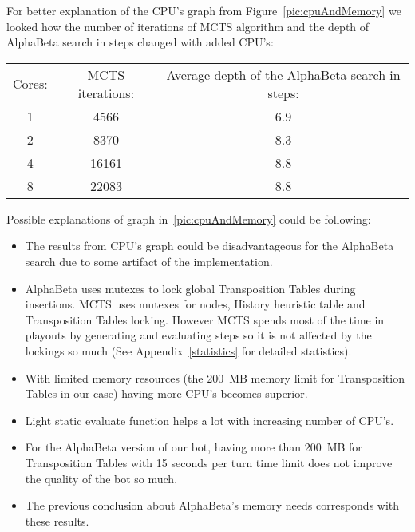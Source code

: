 For better explanation of the CPU's graph from Figure~\ref{pic:cpuAndMemory} we
looked how the number of iterations of MCTS algorithm and the depth of
AlphaBeta search in steps changed with added CPU's:

\begin{center}
\begin{tabular}{ccc}
Cores: & MCTS iterations: & Average depth of the AlphaBeta search in steps: \\
1      &  4566            & 6.9  \\
2      &  8370            & 8.3  \\
4      & 16161            & 8.8  \\
8      & 22083            & 8.8
\end{tabular}
\end{center}

Possible explanations of graph in~\ref{pic:cpuAndMemory} could be following:
\begin{itemize}
\item The results from CPU's graph could be  disadvantageous for the AlphaBeta search due to some artifact of the implementation.
\item AlphaBeta uses mutexes to lock global Transposition Tables during
insertions. MCTS uses mutexes for nodes, History heuristic table and
Transposition Tables locking. However MCTS spends most of the time in playouts
by generating and evaluating steps so it is not affected by the lockings so
much (See Appendix~\ref{statistics} for detailed statistics).
\item With limited memory resources (the 200~MB memory limit for Transposition
Tables in our case) having more CPU's becomes superior.
\item Light static evaluate function helps a lot with increasing number of CPU's.
\item For the AlphaBeta version of our bot, having more than 200~MB for
Transposition Tables with 15 seconds per turn time limit does not improve the
quality of the bot so much.
\item The previous conclusion about AlphaBeta's memory needs corresponds with these results.
\end{itemize}
